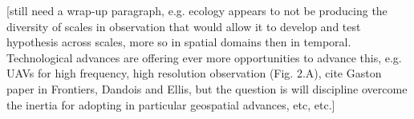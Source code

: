 \documentclass[12pt]{article}
\newcounter{lastnote}
\newenvironment{scilastnote}{%
\setcounter{lastnote}{\value{enumiv}}%
\addtocounter{lastnote}{+1}%
\begin{list}%
{\arabic{lastnote}.}
{\setlength{\leftmargin}{.22in}}
{\setlength{\labelsep}{.5em}}}
{\end{list}}
\begin{document}
[still need a wrap-up paragraph, e.g. ecology appears to not be producing the diversity of scales in observation that would allow it to develop and test hypothesis across scales, more so in spatial domains then in temporal. Technological advances are offering ever more opportunities to advance this, e.g. UAVs for high frequency, high resolution observation (Fig. 2.A), cite Gaston paper in Frontiers, Dandois and Ellis, but the question is will discipline overcome the inertia for adopting in particular geospatial advances, etc, etc.]

















\clearpage
\end{document}
